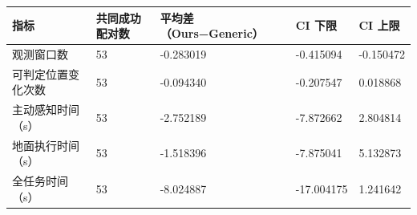 \begin{tabular}{lllll}
\toprule
指标 & 共同成功配对数 & 平均差（Ours−Generic） & CI 下限 & CI 上限 \\
\midrule
观测窗口数 & 53 & -0.283019 & -0.415094 & -0.150472 \\
可判定位置变化次数 & 53 & -0.094340 & -0.207547 & 0.018868 \\
主动感知时间（s） & 53 & -2.752189 & -7.872662 & 2.804814 \\
地面执行时间（s） & 53 & -1.518396 & -7.875041 & 5.132873 \\
全任务时间（s） & 53 & -8.024887 & -17.004175 & 1.241642 \\
\bottomrule
\end{tabular}
